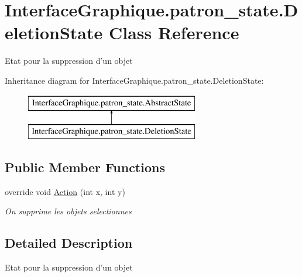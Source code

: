 \hypertarget{class_interface_graphique_1_1patron__state_1_1_deletion_state}{\section{Interface\-Graphique.\-patron\-\_\-state.\-Deletion\-State Class Reference}
\label{class_interface_graphique_1_1patron__state_1_1_deletion_state}
}


Etat pour la suppression d'un objet  


Inheritance diagram for Interface\-Graphique.\-patron\-\_\-state.\-Deletion\-State\-:\begin{figure}[H]
\begin{center}
\leavevmode
\includegraphics[height=2.000000cm]{class_interface_graphique_1_1patron__state_1_1_deletion_state}
\end{center}
\end{figure}
\subsection*{Public Member Functions}
\begin{DoxyCompactItemize}
\item 
override void \hyperlink{class_interface_graphique_1_1patron__state_1_1_deletion_state_ab720f529b212ff1b98d5e97f7fcb199f}{Action} (int x, int y)
\begin{DoxyCompactList}\small\item\em On supprime les objets selectionnes \end{DoxyCompactList}\end{DoxyCompactItemize}


\subsection{Detailed Description}
Etat pour la suppression d'un objet 



